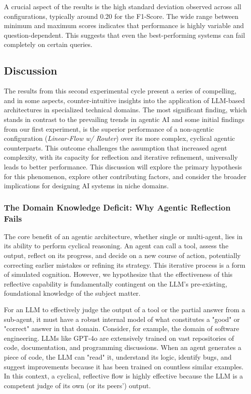         A crucial aspect of the results is the high standard deviation observed across all configurations, typically around 0.20 for the F1-Score. The wide range between minimum and maximum scores indicates that performance is highly variable and question-dependent. This suggests that even the best-performing systems can fail completely on certain queries.



    \subsection{Discussion} \label{sec:exp2-discussion}

        The results from this second experimental cycle present a series of compelling, and in some aspects, counter-intuitive insights into the application of LLM-based architectures in specialized technical domains. The most significant finding, which stands in contrast to the prevailing trends in agentic AI and some initial findings from our first experiment, is the superior performance of a non-agentic configuration (\textit{Linear-Flow w/ Router}) over its more complex, cyclical agentic counterparts. This outcome challenges the assumption that increased agent complexity, with its capacity for reflection and iterative refinement, universally leads to better performance. This discussion will explore the primary hypothesis for this phenomenon, explore other contributing factors, and consider the broader implications for designing AI systems in niche domains.

        \subsubsection{The Domain Knowledge Deficit: Why Agentic Reflection Fails}

            The core benefit of an agentic architecture, whether single or multi-agent, lies in its ability to perform cyclical reasoning. An agent can call a tool, assess the output, reflect on its progress, and decide on a new course of action, potentially correcting earlier mistakes or refining its strategy. This iterative process is a form of simulated cognition. However, we hypothesize that the effectiveness of this reflective capability is fundamentally contingent on the LLM's pre-existing, foundational knowledge of the subject matter.
            
            For an LLM to effectively judge the output of a tool or the partial answer from a sub-agent, it must have a robust internal model of what constitutes a "good" or "correct" answer in that domain. Consider, for example, the domain of software engineering. LLMs like GPT-4o are extensively trained on vast repositories of code, documentation, and programming discussions. When an agent generates a piece of code, the LLM can "read" it, understand its logic, identify bugs, and suggest improvements because it has been trained on countless similar examples. In this context, a cyclical, reflective flow is highly effective because the LLM is a competent judge of its own (or its peers') output.
            
